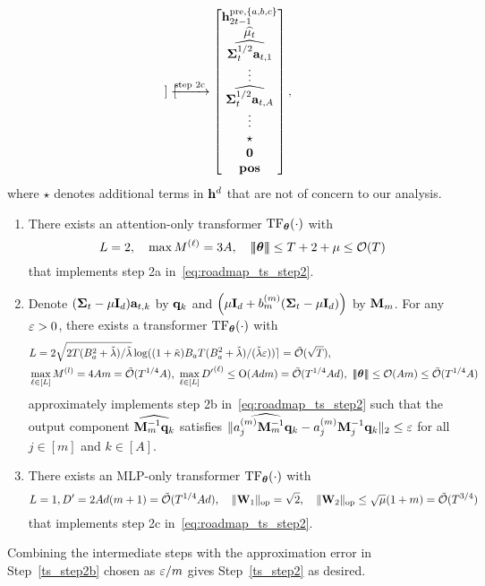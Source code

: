 \begin{align}
\begin{bmatrix}
\end{bmatrix}
\xrightarrow{\text{step 2c}}
   \begin{bmatrix}
    {\mathbf h}_{2t-1}^{{\mathrm{pre}},\{{a},{b},{c}\}}\\\widehat{{{\mathbf\mu}}_t} 
        \\
\widehat{{{\mathbf\Sigma}}_t^{1/2}{\mathbf a}_{t,1}}
\\\vdots\\
         \widehat{{{\mathbf\Sigma}}_t^{1/2}{\mathbf a}_{t,A}}\\\vdots\\
        \star\\ {\mathbf 0} \\{\mathbf{pos}}
\end{bmatrix}\label{eq:roadmap_ts_step2},
\end{align}
where $\star$ denotes additional terms in ${\mathbf h}^{d}$ that are not of concern to our analysis.

\begin{enumerate}[label=Step 2\alph*,ref= 2\alph*]
        \item\label{ts_step2a}  There exists an attention-only transformer ${\rm TF}_{\boldsymbol \theta}(\cdot)$ with     $$L=2,~~~\max M^{{(\ell)}}=3A,~~~ {\left|\!\left|\!\left|{{\boldsymbol \theta}}\right|\!\right|\!\right|}\leq T+2+{{\mu}}\leq\mathcal{O}(T) $$
 that implements step 2a in~\eqref{eq:roadmap_ts_step2}.
     \item\label{ts_step2b} Denote ${({{\mathbf\Sigma}}_t-{\mu}{\mathbf I}_d){\mathbf a}_{t,k}}$ by  ${\mathbf {q}}_{k}$ and $\Big({{\mu}}{\mathbf I}_d+{b_m^{(m)}({{\mathbf\Sigma}}_t-{\mu} {\mathbf I}_d)}\Big)$ by ${\mathbf {M}}_m$. For any $\varepsilon>0$,   there exists a  transformer ${\rm TF}_{\boldsymbol \theta}(\cdot)$ with    
     \begin{align*}
     &L=2\sqrt{2 T(B_a^2+\tilde\lambda)/\tilde\lambda}\log((1+{\tilde \kappa})B_aT(B_a^2+\tilde\lambda)/(\tilde\lambda\varepsilon))\rceil={\tilde{\mathcal O}}(\sqrt{T}),\\  &
     \max_{\ell\in[L]}M^{(l)}=4Am={\tilde{\mathcal O}}(T^{1/4}A),~\max_{\ell\in[L]}{D'}^{(\ell)}\leq {\mathrm{O}}(Adm)={\tilde{\mathcal O}}(T^{1/4}Ad),~ {\left|\!\left|\!\left|{{\boldsymbol \theta}}\right|\!\right|\!\right|}\leq  \mathcal{O}(Am)\leq  {\tilde{\mathcal O}}(T^{1/4}A)
     \end{align*}
     approximately implements step 2b in~\eqref{eq:roadmap_ts_step2} such that the output component $\widehat{{\mathbf {M}}_m^{-1}{\mathbf {q}}_k}$ satisfies $\|\widehat{a_j^{(m)}{\mathbf {M}}_m^{-1}{\mathbf {q}}_k}-{a_j^{(m)}{\mathbf {M}}_j^{-1}{\mathbf {q}}_k}\|_2\leq\varepsilon$ for all $j\in[m]$ and $k\in[A]$.
 \item\label{ts_step2c}  There exists an MLP-only transformer ${\rm TF}_{\boldsymbol \theta}(\cdot)$ with     $$L=1,D'=2Ad(m+1)={\tilde{\mathcal O}}(T^{1/4}Ad),~~~\|{{\mathbf W}_1}\|_{\mathrm{op}}=\sqrt{2}, ~~~\|{{\mathbf W}_2}\|_{\mathrm{op}}\leq \sqrt{{\mu}}(1+m)={\tilde{\mathcal O}}(T^{3/4})$$  that implements step 2c in~\eqref{eq:roadmap_ts_step2}.
\end{enumerate}
Combining the intermediate steps with the approximation error in Step~\ref{ts_step2b} chosen as $\varepsilon/m$  gives Step~\ref{ts_step2} as desired.



